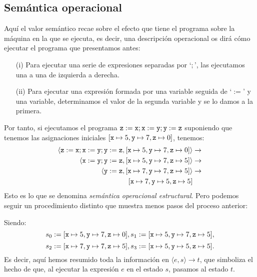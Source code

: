 \subsection{Semántica operacional}

Aquí el valor semántico recae sobre el efecto que tiene el programa sobre la máquina en la que se ejecuta, es decir, una descripción operacional os dirá cómo ejecutar el programa que presentamos antes: 
\begin{itemize}
    \item[(i)] Para ejecutar una serie de expresiones separadas por `$;$', las ejecutamos una a una de izquierda a derecha.
    \item[(ii)] Para ejecutar una expresión formada por una variable seguida de `$:=$' y una variable, determinamos el valor de la segunda variable y se lo damos a la primera. 
\end{itemize}
Por tanto, si ejecutamos el programa $\nz:= \nx; \nx := \ny; \ny := \nz$ suponiendo que tenemos las asignaciones iniciales $[\nx \mapsto 5, \ny \mapsto 7, \nz \mapsto 0]$, tenemos:
\begin{align*}
     \langle \nz:= \nx; \nx := \ny; \ny := \nz,  [\nx \mapsto 5, \ny \mapsto 7, \nz \mapsto 0] \rangle & \rightarrow\\
    \langle \nx := \ny; \ny := \nz,  [\nx \mapsto 5, \ny \mapsto 7, \nz \mapsto 5] \rangle & \rightarrow\\
     \langle \ny := \nz,  [\nx \mapsto 7, \ny \mapsto 7, \nz \mapsto 5] \rangle & \rightarrow \\
     [\nx \mapsto 7, \ny \mapsto 5, \nz \mapsto 5]
\end{align*}
Esto es lo que se denomina \textit{semántica operacional estructural}. Pero podemos seguir un procedimiento distinto que muestra menos pasos del proceso anterior:
\begin{prooftree}
\end{prooftree}
Siendo:
$$s_0 := [\nx \mapsto 5, \ny \mapsto 7, \nz \mapsto 0], s_1 := [\nx \mapsto 5, \ny \mapsto 7, \nz \mapsto 5],$$
$$s_2 := [\nx \mapsto 7, \ny \mapsto 7, \nz \mapsto 5], s_3 := [\nx \mapsto 5, \ny \mapsto 5, \nz \mapsto 5].$$
Es decir, aquí hemos resumido toda la información en $\langle e, s\rangle \rightarrow t$, que simboliza el hecho de que, al ejecutar la expresión $e$ en el estado $s$, pasamos al estado $t$.

